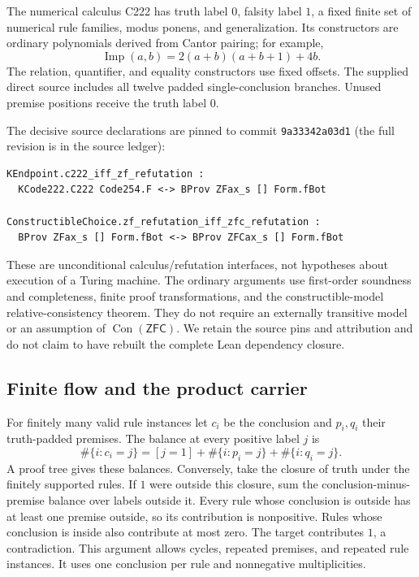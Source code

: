 \documentclass[11pt,letterpaper]{article}
\theoremstyle{definition}
\newcommand{\Con}{\operatorname{Con}}
\newcommand{\ZFC}{\mathsf{ZFC}}
\begin{document}
The numerical calculus C222 has truth label $0$, falsity label $1$, a
fixed finite set of numerical rule families, modus ponens, and
generalization. Its constructors are ordinary polynomials derived from
Cantor pairing; for example,
\[
\operatorname{Imp}(a,b)=2(a+b)(a+b+1)+4b.
\]
The relation, quantifier, and equality constructors use fixed offsets.
The supplied direct source includes all twelve padded single-conclusion
branches. Unused premise positions receive the truth label $0$.

The decisive source declarations are pinned to commit
\texttt{9a33342a03d1} (the full revision is in the source ledger):
\begin{lstlisting}
KEndpoint.c222_iff_zf_refutation :
  KCode222.C222 Code254.F <-> BProv ZFax_s [] Form.fBot

ConstructibleChoice.zf_refutation_iff_zfc_refutation :
  BProv ZFax_s [] Form.fBot <-> BProv ZFCax_s [] Form.fBot
\end{lstlisting}
These are unconditional calculus/refutation interfaces, not
hypotheses about execution of a Turing machine. The ordinary arguments
use first-order soundness and completeness, finite proof transformations,
and the constructible-model relative-consistency theorem. They do not
require an externally transitive model or an assumption of
$\Con(\ZFC)$. We retain the source pins and attribution and do not claim
to have rebuilt the complete Lean dependency closure.

\subsection{Finite flow and the product carrier}

For finitely many valid rule instances let $c_i$ be the conclusion and
$p_i,q_i$ their truth-padded premises. The balance at every positive
label $j$ is
\begin{equation}
\label{eq:flow}
\#\{i:c_i=j\}=[j=1]+\#\{i:p_i=j\}+\#\{i:q_i=j\}.
\end{equation}
A proof tree gives these balances. Conversely, take the closure of truth
under the finitely supported rules. If $1$ were outside this closure,
sum the conclusion-minus-premise balance over labels outside it. Every
rule whose conclusion is outside has at least one premise outside, so
its contribution is nonpositive. Rules whose conclusion is inside also
contribute at most zero. The target contributes $1$, a contradiction.
This argument allows cycles, repeated premises, and repeated rule
instances. It uses one conclusion per rule and nonnegative
multiplicities.
\end{document}
